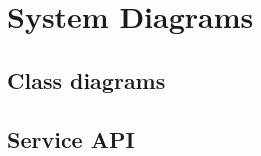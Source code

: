 \chapter{System Diagrams}
\label{Appendix_Diagrams}

\section{Class diagrams}
\label{Appendix_Diagrams_Class}

\section{Service API}
\label{Appendix_Diagrams_ServiceAPI}